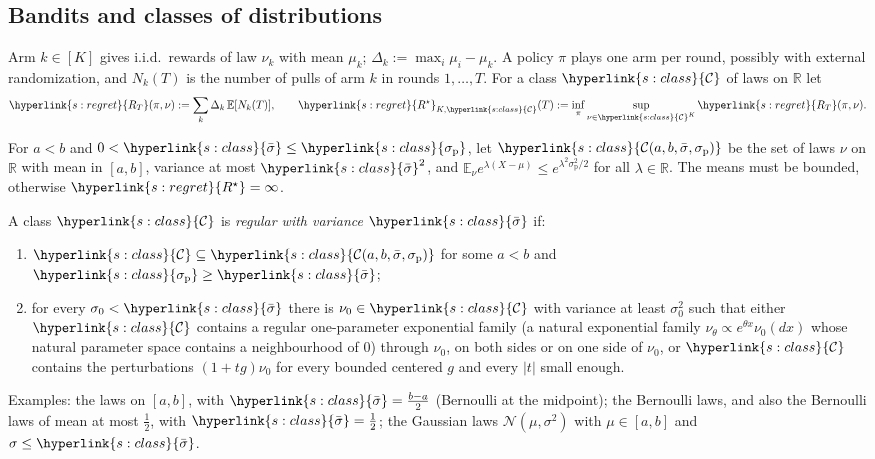 \documentclass[11pt]{article}
\newcommand{\dt}[1]{\hypertarget{#1}{}}
\DeclareRobustCommand{\sy}[2]{{\hyperlink{#1}{#2}}}
\newcommand{\R}{\mathbb{R}}
\newcommand{\E}{\mathbb{E}}
\newcommand{\1}{\mathbf{1}}
\newcommand{\RT}{\sy{s:regret}{R_T}}
\newcommand{\Rs}{\sy{s:regret}{R^\star}}
\newcommand{\Cl}{\sy{s:class}{\mathcal C}}
\newcommand{\Cab}{\sy{s:class}{\mathcal C(a,b,\bar\sigma,\sigma_{\mathrm p})}}
\newcommand{\sbar}{\sy{s:class}{\bar\sigma}}
\newcommand{\sigp}{\sy{s:class}{\sigma_{\mathrm p}}}
\begin{document}
\subsection{Bandits and classes of distributions}
\begin{definition}\label{def:regret}\dt{s:regret}
Arm $k\in[K]$ gives i.i.d.\ rewards of law $\nu_k$ with mean $\mu_k$; $\Delta_k:=\max_i\mu_i-\mu_k$. A policy $\pi$ plays one arm per round,
possibly with external randomization, and $N_k(T)$ is the number of pulls of arm $k$ in rounds $1,\dots,T$. For a class $\Cl$ of laws on $\R$ let
\[
\RT(\pi,\nu):=\sum_k\Delta_k\,\E[N_k(T)],\qquad \Rs_{K,\Cl}(T):=\inf_\pi\sup_{\nu\in\Cl^K}\RT(\pi,\nu).
\]
\end{definition}
\begin{definition}[the classes $\Cab$]\label{def:class}\dt{s:class}
For $a<b$ and $0<\sbar\le\sigp$, let $\Cab$ be the set of laws $\nu$ on $\R$ with mean in $[a,b]$, variance at most $\sbar^2$, and
$\E_\nu e^{\lambda(X-\mu)}\le e^{\lambda^2\sigma_{\mathrm p}^2/2}$ for all $\lambda\in\R$. The means must be bounded, otherwise $\Rs=\infty$.
\end{definition}
\begin{definition}\label{def:regular}
A class $\Cl$ is \emph{regular with variance $\sbar$} if:
\begin{enumerate}
\item[(R1)] $\Cl\subseteq\Cab$ for some $a<b$ and $\sigp\ge\sbar$;
\item[(R2)] for every $\sigma_0<\sbar$ there is $\nu_0\in\Cl$ with variance at least $\sigma_0^2$ such that either $\Cl$ contains a regular one-parameter exponential family
(a natural exponential family $\nu_\theta\propto e^{\theta x}\nu_0(dx)$ whose natural parameter space contains a neighbourhood of $0$) through
$\nu_0$, on both sides or on one side of $\nu_0$, or $\Cl$ contains the perturbations $(1+tg)\nu_0$ for every bounded centered $g$ and every $|t|$ small enough.
\end{enumerate}
\end{definition}
\noindent Examples: the laws on $[a,b]$, with $\sbar=\frac{b-a}2$ (Bernoulli at the midpoint); the Bernoulli laws, and also the Bernoulli laws of mean at most $\frac12$, with
$\sbar=\frac12$; the Gaussian laws $\mathcal N(\mu,\sigma^2)$ with $\mu\in[a,b]$ and $\sigma\le\sbar$.
\end{document}
